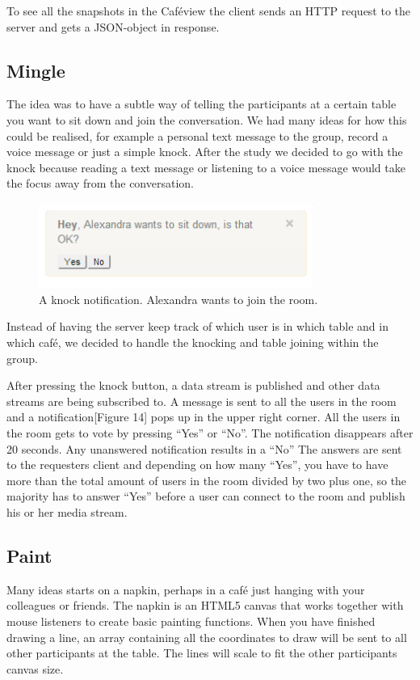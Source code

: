 \documentclass[12pt, titlepage]{article}
\begin{document}
To see all the snapshots in the Caféview the client sends an HTTP request to the server and gets a JSON-object in response.
\subsection{Mingle}
The idea was to have a subtle way of telling the participants at a certain table you want to sit down and join the conversation. We had many ideas for how this could be realised, for example a personal text message to the group, record a voice message or just a simple knock. After the study we decided to go with the knock because reading a text message or listening to a voice message would take the focus away from the conversation. 
\begin{figure}[H]
  \centering
	\includegraphics[width=0.8\textwidth,keepaspectratio]{knock.png}
  \caption{A knock notification. Alexandra wants to join the room.}
\end{figure}
Instead of having the server keep track of which user is in which table and in which café, we decided to handle the knocking and table joining within the group.

After pressing the knock button, a data stream is published and other data streams are being subscribed to. A message is sent to all the users in the room and a notification[Figure 14] pops up in the upper right corner. All the users in the room gets to vote by pressing “Yes” or “No”. The notification disappears after 20 seconds. Any unanswered notification results in a “No” The answers are sent to the requesters client and depending on how many “Yes”, you have to have more than the total amount of users in the room divided by two plus one, so the majority has to answer “Yes” before a user can connect to the room and publish his or her media stream.

\subsection{Paint}
Many ideas starts on a napkin, perhaps in a café just hanging with your colleagues or friends. The napkin is an HTML5 canvas  that works together with mouse listeners to create basic painting functions. When you have finished drawing a line, an array containing all the coordinates to draw will be sent to all other participants at the table. The lines will scale to fit the other participants canvas size.
\end{document}
